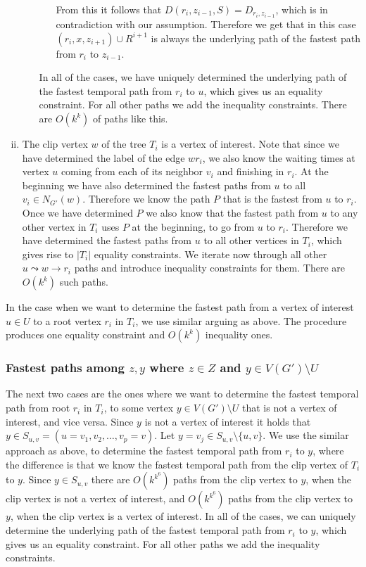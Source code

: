 \documentclass[11pt,a4paper]{article}
\theoremstyle{remark}
\theoremstyle{definition}
\begin{document}
\begin{enumerate}[(i)]
\begin{enumerate}[(a)]
\begin{itemize}
            From this it follows that $D(r_i,z_{i-1},S) = D_{r_i, z_{i-1}}$, which is in contradiction with our assumption.
            Therefore we get that in this case 
            $(r_i, x, z_{i+1}) \cup R^{i+1}$ is always the underlying path of the fastest path from $r_i$ to $z_{i-1}$.
        \end{itemize}
       In all of the cases, we have uniquely determined the underlying path of the fastest temporal path from $r_i$ to $u$,
       which gives us an equality constraint.
       For all other paths we add the inequality constraints. 
       There are $O(k^k)$ of paths like this.
    \end{enumerate}
    
    \item The clip vertex $w$ of the tree $T_i$ is a vertex of interest.
    Note that since we have determined the label of the edge $w r_i$, we also know the waiting times 
    at vertex $u$ coming from each of its neighbor $v_i$ and finishing in $r_i$. 
    At the beginning we have also determined the fastest paths from $u$ to all $v_i \in N_{G'}(w)$.
    Therefore we know the path $P$ that is the fastest from $u$ to $r_i$. 
    Once we have determined $P$ we also know that the fastest path from $u$ to any other vertex in $T_i$ uses $P$ at the beginning, to go from $u$ to $r_i$.
    Therefore we have determined the fastest paths from $u$ to all other vertices in $T_i$,
    which gives rise to $|T_i|$ equality constraints.
    We iterate now through all other $u \leadsto w \rightarrow r_i$ paths and introduce inequality constraints for them. 
    There are $O(k^k)$ such paths.
\end{enumerate}

In the case when we want to determine the fastest path from a vertex of interest $u \in U$ to a root vertex $r_i$ in $T_i$,
we use similar arguing as above.
The procedure produces one equality constraint and $O(k^k)$ inequality ones.

\subsubsection*{\boldmath Fastest paths among $z,y$ where $z \in Z$ and $y \in V(G') \setminus U$}
The next two cases are the ones where we want to determine the fastest temporal path from root $r_i$ in $T_i$, to some vertex $y \in V(G') \setminus U$ that is not a vertex of interest,
and vice versa.
Since $y$ is not a vertex of interest it holds that $y \in S_{u,v}=(u = v_1, v_2, \dots, v_p = v)$. Let $y = v_j \in S_{u,v} \setminus\{u,v\}$.
We use the similar approach as above, to determine the fastest temporal path from $r_i$ to $y$, 
where the difference is that 
we know the fastest temporal path from the clip vertex of $T_i$ to $y$.
Since $y \in S_{u,v}$ there are $O(k^{k^6})$ paths from the clip vertex to $y$, when the clip vertex is not a vertex of interest,
and $O(k^{k^6})$ paths from the clip vertex to $y$, when the clip vertex is a vertex of interest.
In all of the cases, we can uniquely determine the underlying path of the fastest temporal path from $r_i$ to $y$, which gives us an equality constraint.
For all other paths we add the inequality constraints. 
\end{document}
